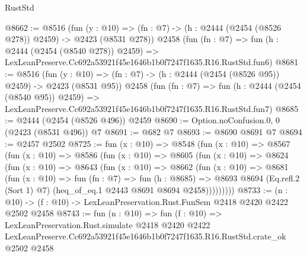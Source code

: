 \begin{lexlean}{RustStd}
\begin{coremodule}
@8662 := @8516
    (fun (y : @10) => (fn : @7) -> (h : @2444 (@2454 (@8526 @278)) @2459) -> @2423 (@8531 @278))
    @2458
    (fun (fn : @7) =>
    fun (h : @2444 (@2454 (@8540 @278)) @2459) =>
    LexLeanPreserve.Cc692a53921f45e1646b1b0f7247f1635.R16.RustStd.fun6)
@8681 := @8516
    (fun (y : @10) => (fn : @7) -> (h : @2444 (@2454 (@8526 @95)) @2459) -> @2423 (@8531 @95))
    @2458
    (fun (fn : @7) =>
    fun (h : @2444 (@2454 (@8540 @95)) @2459) =>
    LexLeanPreserve.Cc692a53921f45e1646b1b0f7247f1635.R16.RustStd.fun7)
@8685 := @2444 (@2454 (@8526 @496)) @2459
@8690 := Option.noConfusion.{0, 0} (@2423 (@8531 @496)) @7
@8691 := @682 @7
@8693 := @8690 @8691 @7
@8694 := @2457 @2502
@8725 := fun (x : @10) =>
  @8548
    (fun (x : @10) =>
    @8567
      (fun (x : @10) =>
      @8586
        (fun (x : @10) =>
        @8605
          (fun (x : @10) =>
          @8624
            (fun (x : @10) =>
            @8643
              (fun (x : @10) =>
              @8662
                (fun (x : @10) =>
                @8681
                  (fun (x : @10) =>
                  fun (fn : @7) =>
                  fun (h : @8685) =>
                  @8693
                    @8694
                    (Eq.refl.{2} (Sort 1) @7)
                    (heq_of_eq.{1} @2443 @8691 @8694 @2458)))))))))
@8733 := (n : @10) -> (f : @10) -> LexLeanPreservation.Rust.FunSem @2418 @2420 @2422 @2502 @2458
@8743 := fun (n : @10) =>
  fun (f : @10) =>
  LexLeanPreservation.Rust.simulate
    @2418
    @2420
    @2422
    LexLeanPreserve.Cc692a53921f45e1646b1b0f7247f1635.R16.RustStd.crate_ok
    @2502
    @2458
\end{coremodule}
\end{lexlean}
